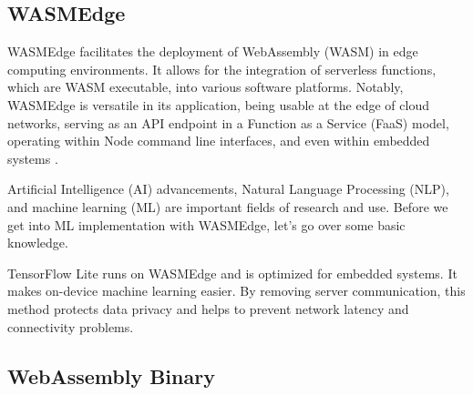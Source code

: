 \subsection{WASMEdge}

WASMEdge facilitates the deployment of WebAssembly\cite{WebAssembly-2024-01-02} (WASM) in edge computing environments. It allows for the integration of serverless functions, which are WASM executable, into various software platforms. Notably, WASMEdge is versatile in its application, being usable at the edge of cloud networks, serving as an API endpoint in a Function as a Service (FaaS) model, operating within Node command line interfaces, and even within embedded systems  \cite{WebAssembly-2024-01-02}.

Artificial Intelligence (AI) advancements, Natural Language Processing (NLP), and machine learning (ML) are important fields of research and use. Before we get into ML implementation with WASMEdge, let's go over some basic knowledge.

TensorFlow Lite runs on WASMEdge and is optimized for embedded systems. It makes on-device machine learning easier. By removing server communication, this method protects data privacy and helps to prevent network latency and connectivity problems.






\subsection{WebAssembly Binary}

